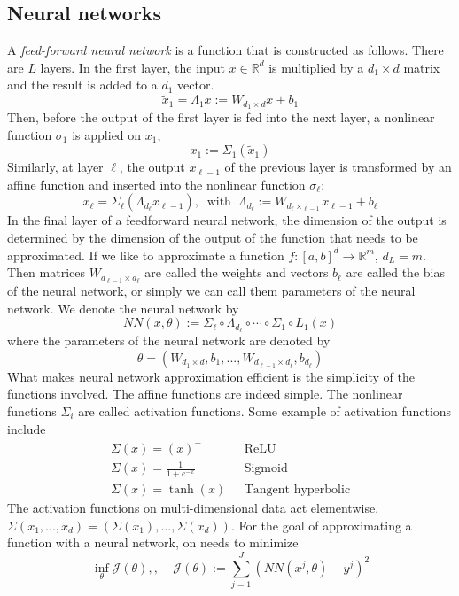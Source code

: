 \documentclass[11pt]{book}
\begin{document}
\subsection{Neural networks}
A \emph{feed-forward neural network} is a function that is constructed as follows. There are $L$ layers.
In the first layer, the input $x\in\mathbb{R}^d$ is multiplied by  a $d_1\times d$ matrix and the result is added to a $d_1$ vector. 
\[
\tilde{x}_1=\Lambda_1x:=W_{d_1\times d}x+b_1
\]
Then, before the output of the first layer is fed into the next layer, a nonlinear function $\sigma_1$ is applied on $x_1$,
\[
x_1:=\Sigma_1(\tilde{x}_1)
\]
Similarly, at layer $\ell$, the output $x_{\ell-1}$ of the previous layer is transformed by an affine function and inserted into the nonlinear function $\sigma_\ell$:
\[
x_\ell=\Sigma_{\ell}(\Lambda_{d_\ell}x_{\ell-1}), ~\text{ with }~\Lambda_{d_\ell}:=W_{d_{\ell}\times_{\ell-1}}x_{\ell-1}+b_\ell
\]
In the final layer of a feedforward neural network, the dimension of the output is determined by the dimension of the output of the function that needs to be approximated.
If we like to approximate a function $f:[a,b]^d\to\mathbb{R}^m$, $d_L=m$. Then matrices $W_{d_{\ell-1}\times{d_{\ell}}}$  are called the weights and vectors $b_\ell$ are called the bias of the neural network, or simply we can call them parameters of the neural network. We denote the neural network by
\[
NN(x,\theta):=\Sigma_{\ell}\circ\Lambda_{d_\ell}\circ\cdots\circ\Sigma_1\circ L_{1}(x)
\]
where the parameters of the neural network are denoted by
\[
\theta=(W_{d_1\times d},b_1,...,W_{d_{\ell-1}\times d_\ell},b_{d_{\ell}})
\]
What makes neural network approximation efficient is the simplicity of the functions involved. The affine functions are indeed simple. The nonlinear functions $\Sigma_i$ are called activation functions. Some example of activation functions include
\begin{align}
    \Sigma(x)=(x)^+&~~~\text{ReLU}\\
    \Sigma(x)=\frac{1}{1+e^{-x}}&~~~\text{Sigmoid}\\
    \Sigma(x)=\tanh(x)&~~~\text{Tangent hyperbolic}
\end{align}
The activation functions on multi-dimensional data act elementwise. $\Sigma(x_1,...,x_d)=(\Sigma(x_1),...,\Sigma(x_d))$.
For the goal of approximating a function with a neural network, on needs to minimize 
\begin{equation}\label{prob:inf_nn}
    \inf_{\theta}\mathcal{J}(\theta),,~~~~~\mathcal{J}(\theta):=\sum_{j=1}^J\left(NN(x^j,\theta)-y^j\right)^2
\end{equation}
\end{document}
